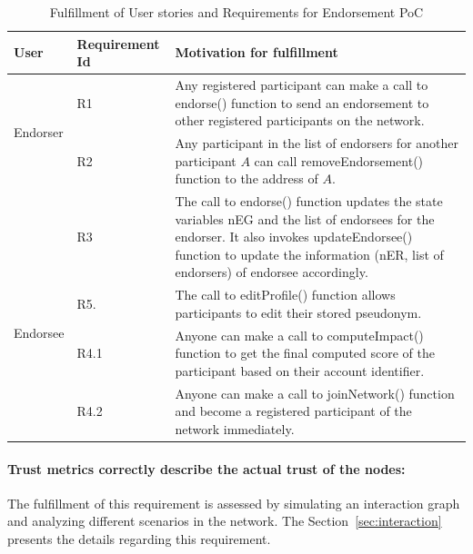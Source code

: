 \begin{center} \label{table:fulfillment} 
	\begin{table}
		\begin{tabular} {| l | l | p{9cm} | }
		\hline
		\textbf{User}  & \textbf{Requirement Id}   & \textbf{Motivation for fulfillment} \\
		\hline
		\multirow{2}{*}{Endorser} & R1 & Any registered participant can make a
		call to endorse() function to send an endorsement to other registered
		participants on the network. 
		\\\cline{2-3} 
		& R2  & Any participant in the list of endorsers for another
		participant $A$ can call removeEndorsement() function to the address of
		$A$.
		\\\cline{2-3}
		& R3 & The call to endorse() function updates the state variables
		\ac{nEG} and the list of endorsees for the endorser. It also invokes
		updateEndorsee() function to update the information (\ac{nER}, list of
		endorsers) of endorsee accordingly. 
		\\\cline{2-3}
		\hline
		\multirow{2}{*}{Endorsee} & R5.& The call to editProfile() function
		allows participants to edit their stored pseudonym.
		\\\cline{2-3}
		\hline
		\multirow{2}{*}{other users} & R4.1 & Anyone can make a call to
		computeImpact() function to get the final computed score of the
		participant based on their account identifier.
		\\\cline{2-3}
		& R4.2 & Anyone can make a call to joinNetwork() function and become a
		registered participant of the network immediately.  
		\\\cline{2-3}
		\hline
	\end{tabular}
	\caption{Fulfillment of User stories and Requirements for Endorsement PoC}
\end{table}
\end{center}
\vspace{-15mm}
\paragraph{Trust metrics correctly describe the actual trust of the nodes:}The
fulfillment of this requirement is assessed by simulating an interaction graph
and analyzing different scenarios in the network. The
Section~\ref{sec:interaction} presents the details regarding this requirement. 
